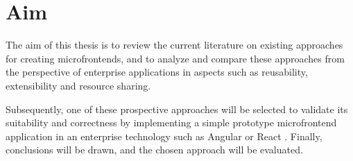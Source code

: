\section{Aim}
The aim of this thesis is to review the current literature on existing approaches for creating microfrontends, and to analyze and compare these approaches from the perspective of enterprise applications in aspects such as reusability, extensibility and resource sharing.

Subsequently, one of these prospective approaches will be selected to validate its suitability and correctness by implementing a simple prototype microfrontend application in an enterprise technology such as Angular \cite{Angular} or React \cite{React}. Finally, conclusions will be drawn, and the chosen approach will be evaluated.